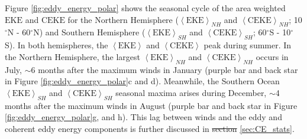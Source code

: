 \documentclass[draft,linenumbers]{agujournal2019}
\newcommand{\EKE}{\textrm{EKE}}
\newcommand{\CEKE}{\textrm{CEKE}}
\providecommand{\DIFadd}[1]{{\protect\color{blue}\uwave{#1}}} %
\providecommand{\DIFdel}[1]{{\protect\color{red}\sout{#1}}}                      %
\providecommand{\DIFaddbegin}{} %
\providecommand{\DIFaddend}{} %
\providecommand{\DIFdelbegin}{} %
\providecommand{\DIFdelend}{} %
\begin{document}


	Figure \ref{fig:eddy_energy_polar} shows the seasonal cycle of the area weighted $\EKE$ and $\CEKE$ for the Northern Hemisphere ($\left< \EKE\right>_{NH}$ and $\left< \CEKE\right>_{NH}$; 10$^\circ$N - 60$^\circ$N) and Southern Hemisphere ($\left< \EKE\right>_{SH}$  and $\left< \CEKE\right>_{SH}$; 60$^\circ$S - 10$^\circ$S). 
	In both hemispheres, the $\left<\EKE\right>$ and $\left<\CEKE\right>$ peak during summer. In the Northern Hemisphere, the largest $\left<\EKE\right>_{NH}$ and $\left<\CEKE\right>_{NH}$ occurs in July, $\sim$6 months after the maximum winds in January (purple bar and back star in Figure \ref{fig:eddy_energy_polar}c and d). Meanwhile, the Southern Ocean 
	$\left<\EKE\right>_{SH}$ and $\left<\CEKE\right>_{SH}$ seasonal maxima arises during December, $\sim$4 months after the maximum winds in August (purple bar and back star in Figure \ref{fig:eddy_energy_polar}g, and h). This lag between winds and the eddy and coherent eddy energy components is further discussed in \DIFdelbegin \DIFdel{section }\DIFdelend \DIFaddbegin \DIFadd{Section }\DIFaddend \ref{sec:CE_stats}.
\end{document}
